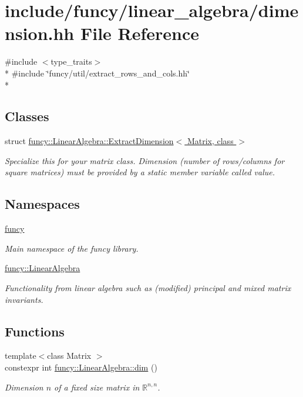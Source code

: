 \hypertarget{dimension_8hh}{\section{include/funcy/linear\-\_\-algebra/dimension.hh File Reference}
\label{dimension_8hh}
}
{\ttfamily \#include $<$type\-\_\-traits$>$}\\*
{\ttfamily \#include \char`\"{}funcy/util/extract\-\_\-rows\-\_\-and\-\_\-cols.\-hh\char`\"{}}\\*
\subsection*{Classes}
\begin{DoxyCompactItemize}
\item 
struct \hyperlink{structfuncy_1_1LinearAlgebra_1_1ExtractDimension}{funcy\-::\-Linear\-Algebra\-::\-Extract\-Dimension$<$ Matrix, class $>$}
\begin{DoxyCompactList}\small\item\em Specialize this for your matrix class. Dimension (number of rows/columns for square matrices) must be provided by a static member variable called value. \end{DoxyCompactList}\end{DoxyCompactItemize}
\subsection*{Namespaces}
\begin{DoxyCompactItemize}
\item 
\hyperlink{namespacefuncy}{funcy}
\begin{DoxyCompactList}\small\item\em Main namespace of the funcy library. \end{DoxyCompactList}\item 
\hyperlink{namespacefuncy_1_1LinearAlgebra}{funcy\-::\-Linear\-Algebra}
\begin{DoxyCompactList}\small\item\em Functionality from linear algebra such as (modified) principal and mixed matrix invariants. \end{DoxyCompactList}\end{DoxyCompactItemize}
\subsection*{Functions}
\begin{DoxyCompactItemize}
\item 
{\footnotesize template$<$class Matrix $>$ }\\constexpr int \hyperlink{namespacefuncy_1_1LinearAlgebra_a9a0c9eebca2ecfd137b88321a0f866b7}{funcy\-::\-Linear\-Algebra\-::dim} ()
\begin{DoxyCompactList}\small\item\em Dimension $n$ of a fixed size matrix in $\mathbb{R}^{n,n}$. \end{DoxyCompactList}\end{DoxyCompactItemize}
